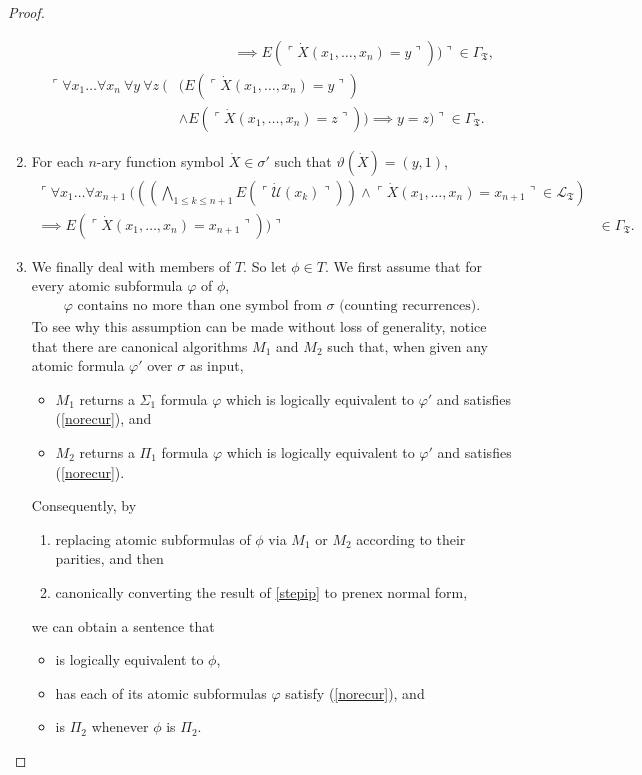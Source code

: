\documentclass[12pt, twoside]{memoir}
\numberwithin{equation}{section}
\theoremstyle{definition}
\theoremstyle{remark}
\theoremstyle{definition}
\theoremstyle{definition}
\theoremstyle{definition}
\theoremstyle{remark}
\begin{document}
\begin{proof}
\begin{enumerate}[label=(\arabic*)]
\begin{align*}
        & \mspace{70mu} \implies E(\ulcorner \dot{X}(x_1, \dots, x_n) = y \urcorner)) \urcorner \in \Gamma_{\mathfrak{T}}, \\
        \ulcorner \forall x_1 \dots \forall x_n \ \forall y \ \forall z \ ( & (E(\ulcorner \dot{X} (x_1, \dots, x_n) = y \urcorner) \\ 
        & \wedge E(\ulcorner \dot{X} (x_1, \dots, x_n) = z \urcorner)) \implies y = z) \urcorner \in \Gamma_{\mathfrak{T}}.
    \end{align*}
    \item\label{gamma5} For each $n$-ary function symbol $\dot{X} \in \sigma'$ such that $\vartheta(\dot{X}) = (y, 1)$, 
    \begin{align*}
        \ulcorner \forall x_1 \dots \forall x_{n+1} \ (((\bigwedge_{1 \leq k \leq n+1} E(\ulcorner \dot{\mathcal{U}}(x_k) \urcorner)) \wedge \ulcorner \dot{X}(x_1, \dots, x_n) = x_{n+1} \urcorner \in \mathcal{L}_{\mathfrak{T}}) & \\
        \implies E(\ulcorner \dot{X}(x_1, \dots, x_n) = x_{n+1} \urcorner)) \urcorner & \in \Gamma_{\mathfrak{T}}.
    \end{align*}
    \item\label{gamma6} We finally deal with members of $T$. So let $\phi \in T$. We first assume that for every atomic subformula $\varphi$ of $\phi$, 
    \begin{align}\label{norecur}
        \varphi \text{ contains no more than one symbol from } \sigma \text{ (counting recurrences).} 
    \end{align} 
    To see why this assumption can be made without loss of generality, notice that there are canonical algorithms $M_1$ and $M_2$ such that, when given any atomic formula $\varphi'$ over $\sigma$ as input,
    \begin{itemize}
        \item $M_1$ returns a $\Sigma_1$ formula $\varphi$ which is logically equivalent to $\varphi'$ and satisfies (\ref{norecur}), and
        \item $M_2$ returns a $\Pi_1$ formula $\varphi$ which is logically equivalent to $\varphi'$ and satisfies (\ref{norecur}).
    \end{itemize}
    Consequently, by 
    \begin{enumerate}[label=(\Roman*)]
        \item\label{stepip} replacing atomic subformulas of $\phi$ via $M_1$ or $M_2$ according to their parities, and then
        \item canonically converting the result of \ref{stepip} to prenex normal form,
    \end{enumerate}
    we can obtain a sentence that
    \begin{itemize}
        \item is logically equivalent to $\phi$,
        \item has each of its atomic subformulas $\varphi$ satisfy (\ref{norecur}), and
        \item is $\Pi_2$ whenever $\phi$ is $\Pi_2$.
    \end{itemize}
    

\end{enumerate}
\end{proof}
\end{document}
